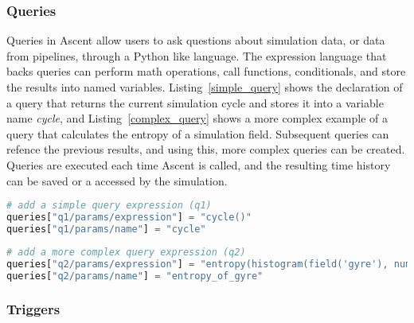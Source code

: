 \subsubsection{Queries}
Queries in Ascent allow users to ask questions about simulation data,
or data from pipelines, through a Python like language.
%
The expression language that backs queries can perform math operations,
call functions, conditionals, and store the results into named variables.
%
Listing~\ref{simple_query} shows the declaration of a query that returns
the current simulation cycle and stores it into a variable name \textit{cycle},
and Listing~\ref{complex_query} shows a more complex example of a query that
calculates the entropy of a simulation field.
%
Subsequent queries can refence the previous results, and using this,
more complex queries can be created.
%
Queries are executed each time Ascent is called, and the resulting time
history can be saved or a accessed by the simulation.

\begin{lstlisting}[language=Python,caption={Examples of querying the simulation cycle}, label={simple_query}]
# add a simple query expression (q1)
queries["q1/params/expression"] = "cycle()"
queries["q1/params/name"] = "cycle"
\end{lstlisting}

\begin{lstlisting}[language=Python,caption={A more complex example of queries in Ascent}, label={complex_query}]
# add a more complex query expression (q2)
queries["q2/params/expression"] = "entropy(histogram(field('gyre'), num_bins=128))"
queries["q2/params/name"] = "entropy_of_gyre"
\end{lstlisting}


\subsubsection{Triggers}
